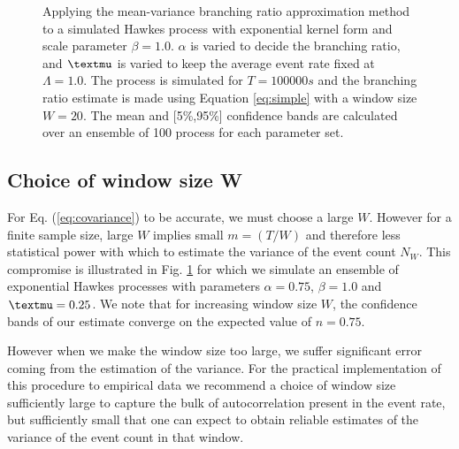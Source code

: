 \documentclass{article}
\begin{document}
\begin{figure}[h]
  \caption{\label{fig:varying} Applying the mean-variance branching ratio
  approximation method to a simulated Hawkes process with exponential kernel
  form and scale parameter $\beta = 1.0$. $\alpha$ is varied to decide the
  branching ratio, and ${\textmu}$ is varied to keep the average event rate
  fixed at $\Lambda = 1.0$. The process is simulated for $T = 100000 s$ and
  the branching ratio estimate is made using Equation \ref{eq:simple} with a
  window size $W = 20$. The mean and [5\%,95\%] confidence bands are
  calculated over an ensemble of 100 process for each parameter set.}
\end{figure}

\subsection{Choice of window size W}

For Eq. (\ref{eq:covariance}) to be accurate, we must choose a large $W$.
However for a finite sample size, large $W$ implies small $m = (T / W)$ and
therefore less statistical power with which to estimate the variance of the
event count $N_W$. This compromise is illustrated in Fig. \ref{fig:varying}
for which we simulate an ensemble of exponential Hawkes processes with
parameters $\alpha = 0.75$, $\beta = 1.0$ and ${\textmu}= 0.25$. We note that
for increasing window size $W$, the confidence bands of our estimate converge
on the expected value of $n = 0.75$.

However when we make the window size too large, we suffer significant error
coming from the estimation of the variance. For the practical implementation
of this procedure to empirical data we recommend a choice of window size
sufficiently large to capture the bulk of autocorrelation present in the event
rate, but sufficiently small that one can expect to obtain reliable estimates
of the variance of the event count in that window.
\end{document}

